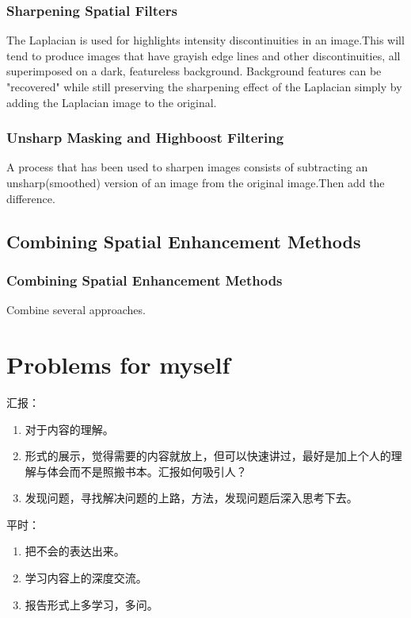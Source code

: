 \documentclass[notheorems, serif, table, compress]{beamer}  %
\begin{document}
\begin{frame}
\frametitle{Sharpening Spatial Filters}
 The Laplacian is used for highlights intensity discontinuities in an image.This will tend to produce images that have grayish edge lines and other discontinuities, all superimposed on a dark, featureless background.
Background features can be "recovered" while still preserving the sharpening effect of the Laplacian simply by adding the Laplacian image to the original.


\end{frame}



\begin{frame}
\frametitle{Unsharp Masking and Highboost Filtering}%
 A process that has been used to sharpen images consists of subtracting an unsharp(smoothed) version of an image from the original image.Then add the difference.

\end{frame}
\subsection{Combining Spatial Enhancement Methods}%
\begin{frame}
\frametitle{Combining Spatial Enhancement Methods}
 Combine several approaches.
 \end{frame}
\section{Problems for myself}

 汇报：
\begin{enumerate}
\item 对于内容的理解。
\item 形式的展示，觉得需要的内容就放上，但可以快速讲过，最好是加上个人的理解与体会而不是照搬书本。汇报如何吸引人？
\item 发现问题，寻找解决问题的上路，方法，发现问题后深入思考下去。
\end{enumerate}

平时：
\begin{enumerate}
\item 把不会的表达出来。
\item 学习内容上的深度交流。
\item 报告形式上多学习，多问。
\end{enumerate}


\end{document}
